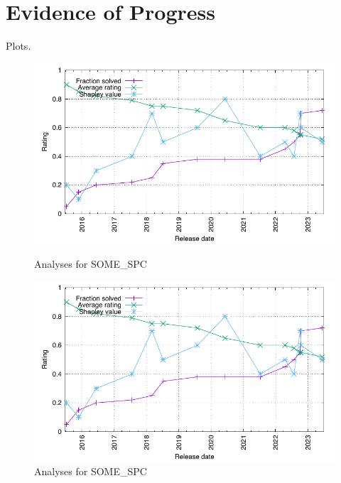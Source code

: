 \documentclass[runningheads]{llncs}
\begin{document}
\section{Evidence of Progress}
\label{Evidence}

Plots.
\begin{figure}[ht!]
\centering
\begin{minipage}{.49\textwidth}
  \centering
  \includegraphics[width=\textwidth]{Plots/GNUPlots/TestData.pdf}
  \vspace*{-1em}
  \caption{Analyses for SOME\_SPC}
  \label{SOME_SPC_Plot}
\end{minipage}
\begin{minipage}{.49\textwidth}
  \centering
  \includegraphics[width=\textwidth]{Plots/GNUPlots/TestData.pdf}
  \vspace*{-1em}
  \caption{Analyses for SOME\_SPC}
  \label{SOME_SPC_Plot}
\end{minipage}
\end{figure}
\end{document}
